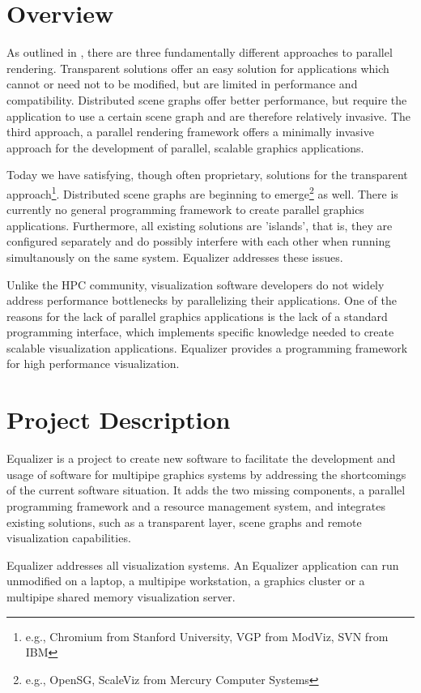 \documentclass[10pt,a4paper]{scrartcl}
\begin{document}
\section{Overview}
As outlined in \cite{Analysis}, there are three fundamentally different
approaches to parallel rendering. Transparent solutions offer an easy
solution for applications which cannot or need not to be modified, but
are limited in performance and compatibility. Distributed
scene graphs offer better performance, but require the application
to use a certain scene graph and are therefore relatively invasive. The
third approach, a parallel rendering framework offers a minimally
invasive approach for the development of parallel, scalable graphics
applications.

Today we have satisfying, though often proprietary, solutions for the
transparent approach\footnote{e.g., Chromium from Stanford University,
VGP from ModViz, SVN from IBM}. Distributed scene graphs are beginning
to emerge\footnote{e.g., OpenSG, ScaleViz from Mercury Computer Systems} as
well. There is currently no general programming framework to create
parallel graphics applications. Furthermore, all existing solutions are
'islands', that is, they are configured separately and do possibly
interfere with each other when running simultanously on the same
system. Equalizer addresses these issues.

Unlike the HPC community, visualization software developers do not
widely address performance bottlenecks by parallelizing
their applications. One of the reasons for the lack of parallel graphics
applications is the lack of a standard programming interface, which
implements specific knowledge needed to create scalable visualization
applications. Equalizer provides a programming framework for high
performance visualization.

\section{Project Description}

Equalizer is a project to create new software to facilitate the
development and usage of software for multipipe
graphics systems by addressing the shortcomings of the current
software situation. It adds the two missing components, a
parallel programming framework and a resource management system, and
integrates existing solutions, such as a transparent layer, scene graphs
and remote visualization capabilities.

Equalizer addresses all visualization systems. An Equalizer application
can run unmodified on a laptop, a multipipe workstation, a graphics
cluster or a multipipe shared memory visualization server.
\end{document}
